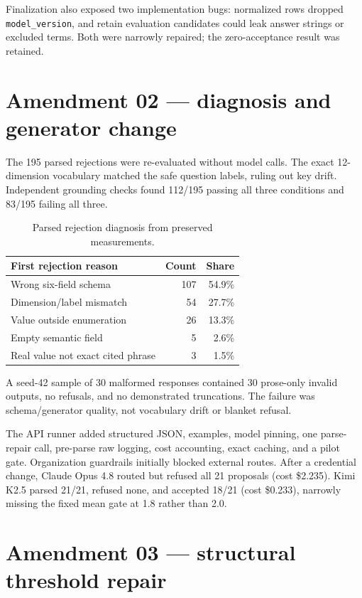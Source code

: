 \documentclass[11pt]{article}
\begin{document}
Finalization also exposed two implementation bugs: normalized rows dropped
\texttt{model\_version}, and retain evaluation candidates could leak answer
strings or excluded terms. Both were narrowly repaired; the zero-acceptance
result was retained.

\section{Amendment 02 --- diagnosis and generator change}

The 195 parsed rejections were re-evaluated without model calls. The exact
12-dimension vocabulary matched the safe question labels, ruling out key drift.
Independent grounding checks found 112/195 passing all three conditions and
83/195 failing all three.

\begin{table}[h]
\centering
\begin{tabular}{lrr}
\toprule
First rejection reason & Count & Share \\
\midrule
Wrong six-field schema & 107 & 54.9\% \\
Dimension/label mismatch & 54 & 27.7\% \\
Value outside enumeration & 26 & 13.3\% \\
Empty semantic field & 5 & 2.6\% \\
Real value not exact cited phrase & 3 & 1.5\% \\
\bottomrule
\end{tabular}
\caption{Parsed rejection diagnosis from preserved measurements.}
\end{table}

A seed-42 sample of 30 malformed responses contained 30 prose-only invalid
outputs, no refusals, and no demonstrated truncations. The failure was
schema/generator quality, not vocabulary drift or blanket refusal.

The API runner added structured JSON, examples, model pinning, one parse-repair
call, pre-parse raw logging, cost accounting, exact caching, and a pilot gate.
Organization guardrails initially blocked external routes. After a credential
change, Claude Opus 4.8 routed but refused all 21 proposals (cost \$2.235). Kimi
K2.5 parsed 21/21, refused none, and accepted 18/21 (cost \$0.233), narrowly
missing the fixed mean gate at 1.8 rather than 2.0.

\section{Amendment 03 --- structural threshold repair}
\end{document}
